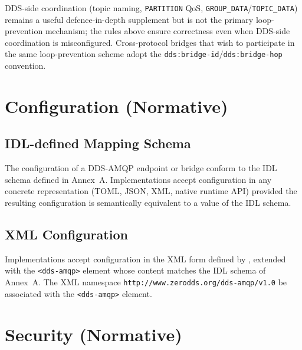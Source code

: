 \documentclass{../styles/zerodds-vendor-spec}
\begin{document}
\begin{specnote}
DDS-side coordination (topic naming, \texttt{PARTITION} QoS,
\texttt{GROUP\_DATA}/\texttt{TOPIC\_DATA}) remains a useful
defence-in-depth supplement but is not the primary
loop-prevention mechanism; the rules above ensure correctness
even when DDS-side coordination is misconfigured.
Cross-protocol bridges that wish to participate in the same
loop-prevention scheme  adopt the
\texttt{dds:bridge-id}/\texttt{dds:bridge-hop} convention.
\end{specnote}

\chapter{Configuration (Normative)}\label{ch:configuration}

\section{IDL-defined Mapping Schema}

The configuration of a DDS-AMQP endpoint or bridge 
conform to the IDL schema defined in Annex~A. Implementations
 accept configuration in any concrete representation
(TOML, JSON, XML, native runtime API) provided the resulting
configuration is semantically equivalent to a value of the IDL
schema.

\section{XML Configuration}

Implementations  accept configuration in the XML form
defined by , extended with the
\texttt{<dds-amqp>} element whose content matches the IDL schema
of Annex~A. The XML namespace
\texttt{http://www.zerodds.org/dds-amqp/v1.0}
 be associated with the \texttt{<dds-amqp>} element.

\chapter{Security (Normative)}\label{ch:security}
\end{document}
